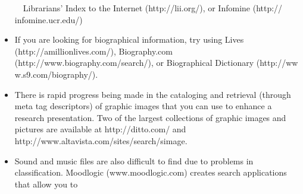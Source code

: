 \documentclass{article}
\begin{document}
\begin{itemize}
	$\quad$Librarians' Index to the Internet (http://lii.org/), or Infomine (http://
	infomine.ucr.edu/)
	
	\item
	If you are looking for biographical information, try using Lives (http://amillionlives.com/), Biography.com (http://www.biography.com/search/), or Biographical Dictionary (http://ww\\w.s9.com/biography/).
	
	\item
	There is rapid progress being made in the cataloging and retrieval (through meta tag descriptors) of graphic images that you can use to enhance a research presentation. Two of the largest collections of graphic images and pictures are available at http://ditto.com/ and http://www.altavista.com/sites/search/simage. 
	
	\item
	Sound and music files are also difficult to find due to problems in classification. Moodlogic (www.moodlogic.com) creates search applications that allow you to
	
\end{itemize}
\end{document}
